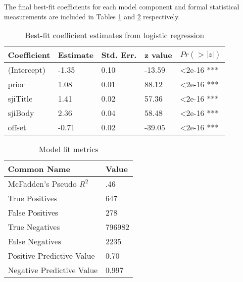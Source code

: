 \documentclass[10pt,letterpaper]{article}
\begin{document}
The final best-fit coefficients for each model component and formal statistical measurements are included in Tables \ref{tab:coeffs} and \ref{tab:fits} respectively.

\renewcommand{\arraystretch}{1}%
\renewcommand{\tabcolsep}{1mm}
\begin{table}[!ht]
  \begin{center} 
    \caption{Best-fit coefficient estimates from logistic regression} 
    \label{tab:coeffs} 
    \vskip 0.12in
    \begin{tabular}{lllll} 
      \hline
      Coefficient & 	Estimate &	Std. Err. &	z value &	$Pr(>|z|)$  \\
      \hline
      (Intercept) &	-1.35 &		0.10 &		-13.59 &	\textless2e-16 *** \\
      prior &		1.08 & 		0.01 &		88.12 & 	\textless2e-16 *** \\
      sjiTitle &	1.41 &		0.02 &		57.36 &		\textless2e-16 *** \\
      sjiBody &		2.36 &		0.04 &		58.48 &		\textless2e-16 *** \\
      offset &		-0.71 &		0.02 &		-39.05 &	\textless2e-16 *** \\
      \hline
    \end{tabular} 
  \end{center} 
\end{table}

\vspace{-2em}

\renewcommand{\arraystretch}{1}%
\renewcommand{\tabcolsep}{3mm}
\begin{table}[!ht]
  \begin{center} 
    \caption{Model fit metrics} 
    \label{tab:fits} 
    \vskip 0.12in
    \begin{tabular}{ll} 
      \hline
      Common Name &  Value	\\
      \hline
      McFadden's Pseudo $R_{}^{2}$ &	.46 \\
      True Positives &			647 \\
      False Positives &			278 \\
      True Negatives &			\num{796982} \\
      False Negatives &			\num{2235} \\
      Positive Predictive Value &	0.70 \\
      Negative Predictive Value &	0.997 \\
      \hline
    \end{tabular} 
  \end{center} 
\end{table}
\end{document}
